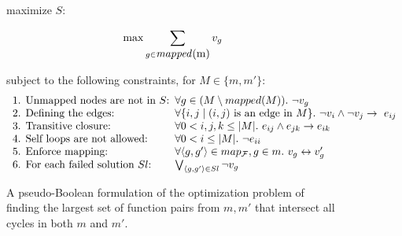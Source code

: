 \begin{figure}
maximize $S$: \begin{minipage}{5 cm} \[ \max\sum_{g \in \mbox{\emph{mapped}(m)}}  v_g \] \end{minipage}

\vspace{0.1 cm}
subject to the following constraints, for $M \in \{m,m'\}$:
%
\[
\begin{array}{p{5 cm}l}
\mbox{1. Unmapped nodes are not in $S$:} &  \forall g \in (M \setminus mapped(M)).\ \lnot v_g \\
\mbox{2. Defining the edges:} & \forall \{i, j \mid (i,j) \mbox { is an edge in $M$}\}.\ \lnot v_i \land \lnot v_j \rightarrow \ e_{ij} \\
\mbox{3. Transitive closure:} &  \forall 0 < i,j,k \leq |M|.\ e_{ij} \land e_{jk} \rightarrow e_{ik} \\
\mbox{4. Self loops are not allowed:} & \forall 0 < i \leq |M|.\ \lnot e_{ii} \\
\mbox{5. Enforce mapping:} & \forall \pair{g,g'} \in \mapf, g \in m.\ v_g \leftrightarrow v_g' \\
\mbox{6. For each  failed solution $Sl$:} & \bigvee_{\pair{g,g'} \in Sl} \lnot v_g \\
\end{array}
\]
%
\caption{A pseudo-Boolean formulation of the optimization problem of finding the largest set of function pairs from $m,m'$ that intersect all cycles in both $m$ and $m'$.}\label{fig:pbs}
\end{figure}
%

